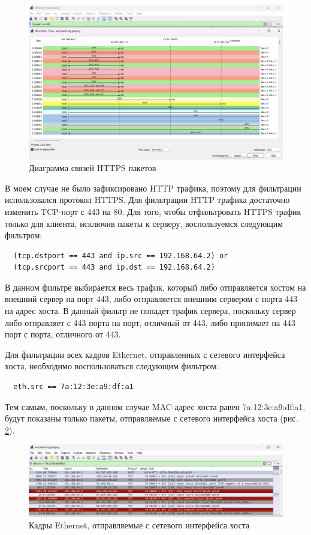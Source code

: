 \documentclass[a4paper, 14pt]{extarticle}
\begin{document}
\begin{figure}[H]
  \centering
  \includegraphics[width=\textwidth]{images/https-flow-graph.png}
  \caption{Диаграмма связей HTTPS пакетов}
  \label{fig:https-flow-graph}
\end{figure}

В моем случае не было зафиксировано HTTP трафика, поэтому для фильтрации
использовался протокол HTTPS. Для фильтрации HTTP трафика достаточно изменить
TCP-порт с 443 на 80. Для того, чтобы отфильтровать HTTPS трафик только для
клиента, исключив пакеты к серверу, воспользуемся следующим фильтром:
\begin{verbatim}
  (tcp.dstport == 443 and ip.src == 192.168.64.2) or
  (tcp.srcport == 443 and ip.dst == 192.168.64.2)
\end{verbatim}
В данном фильтре выбирается весь трафик, который либо отправляется хостом на
внешний сервер на порт 443, либо отправляется внешним сервером с порта 443 на
адрес хоста. В данный фильтр не попадет трафик сервера, поскольку сервер либо
отправляет с 443 порта на порт, отличный от 443, либо принимает на 443 порт с
порта, отличного от 443.

Для фильтрации всех кадров Ethernet, отправленных с сетевого интерфейса хоста,
необходимо воспользоваться следующим фильтром:
\begin{verbatim}
  eth.src == 7a:12:3e:a9:df:a1
\end{verbatim}
Тем самым, поскольку в данном случае MAC-адрес хоста равен 7a:12:3e:a9:df:a1,
будут показаны только пакеты, отправляемые с сетевого интерфейса хоста (рис.
\ref{fig:eth-src}).

\begin{figure}[H]
  \centering
  \includegraphics[width=\textwidth]{images/eth-src.png}
  \caption{Кадры Ethernet, отправляемые с сетевого интерфейса хоста}
  \label{fig:eth-src}
\end{figure}
\end{document}
